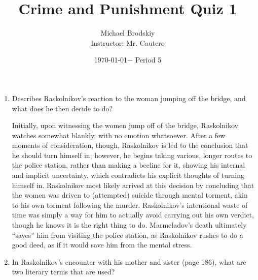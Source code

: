 \documentclass[12pt]{article}
\title{Crime and Punishment Quiz 1}
\date{\today $-$ Period 5}
\author{Michael Brodskiy\\ \small Instructor: Mr. Cautero}
\begin{document}
\maketitle

\begin{enumerate}

  \item Describes Raskolnikov's reaction to the woman jumping off the bridge, and what does he then decide to do? 

    \begin{justify}

      Initially, upon witnessing the women jump off of the bridge, Raskolnikov watches somewhat blankly, with no emotion whatsoever. After a few moments of consideration, though, Raskolnikov is led to the conclusion that he should turn himself in; however, he begins taking various, longer routes to the police station, rather than making a beeline for it, showing his internal and implicit uncertainty, which contradicts his explicit thoughts of turning himself in. Raskolnikov most likely arrived at this decision by concluding that the women was driven to (attempted) suicide through mental torment, akin to his own torment following the murder. Raskolnikov's intentional waste of time was simply a way for him to actually avoid carrying out his own verdict, though he knows it is the right thing to do. Marmeladov's death ultimately “saves” him from visiting the police station, as Raskolnikov rushes to do a good deed, as if it would save him from the mental stress.
      
    \end{justify}

  \item In Raskolnikov's encounter with his mother and sister (page 186), what are two literary terms that are used?

    \begin{justify}


\end{justify}
\end{enumerate}
\end{document}
